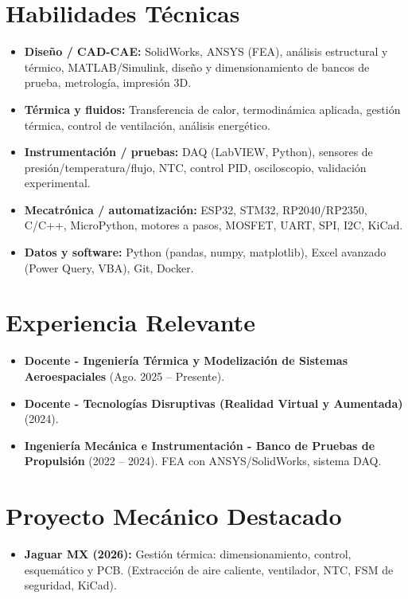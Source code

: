 \documentclass[10pt,a4paper]{article}
\begin{document}
\section*{Habilidades Técnicas}
\begin{itemize}[leftmargin=*, noitemsep]
    \item \textbf{Diseño / CAD-CAE:} SolidWorks, ANSYS (FEA), análisis estructural y térmico, MATLAB/Simulink, diseño y dimensionamiento de bancos de prueba, metrología, impresión 3D.
    \item \textbf{Térmica y fluidos:} Transferencia de calor, termodinámica aplicada, gestión térmica, control de ventilación, análisis energético.
    \item \textbf{Instrumentación / pruebas:} DAQ (LabVIEW, Python), sensores de presión/temperatura/flujo, NTC, control PID, osciloscopio, validación experimental.
    \item \textbf{Mecatrónica / automatización:} ESP32, STM32, RP2040/RP2350, C/C++, MicroPython, motores a pasos, MOSFET, UART, SPI, I2C, KiCad.
    \item \textbf{Datos y software:} Python (pandas, numpy, matplotlib), Excel avanzado (Power Query, VBA), Git, Docker.
\end{itemize}

\section*{Experiencia Relevante}
\begin{itemize}[leftmargin=*, noitemsep]
    \item \textbf{Docente - Ingeniería Térmica y Modelización de Sistemas Aeroespaciales} (Ago. 2025 -- Presente).
    \item \textbf{Docente - Tecnologías Disruptivas (Realidad Virtual y Aumentada)} (2024).
    \item \textbf{Ingeniería Mecánica e Instrumentación - Banco de Pruebas de Propulsión} (2022 -- 2024). FEA con ANSYS/SolidWorks, sistema DAQ.
\end{itemize}

\section*{Proyecto Mecánico Destacado}
\begin{itemize}[leftmargin=*, noitemsep]
    \item \textbf{Jaguar MX (2026):} Gestión térmica: dimensionamiento, control, esquemático y PCB. (Extracción de aire caliente, ventilador, NTC, FSM de seguridad, KiCad).
\end{itemize}
\end{document}
